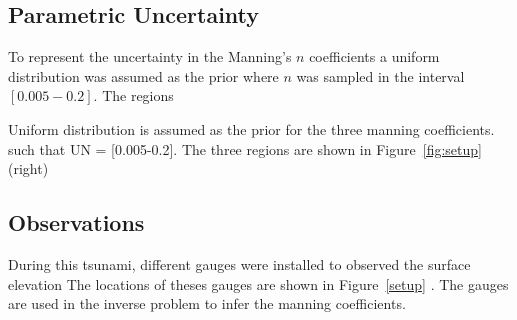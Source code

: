 \subsection{Parametric Uncertainty}
To represent the uncertainty in the Manning's $n$ coefficients a uniform distribution was assumed as the prior where $n$ was sampled in the interval $[0.005-0.2]$.  The regions

Uniform distribution is assumed as the prior for the three manning coefficients.
such that UN = [0.005-0.2]. The three regions are shown in Figure~\ref{fig:setup}(right)

\subsection{Observations}
During this tsunami, different gauges were installed to observed the surface elevation
The locations of theses gauges are shown in Figure~\ref{setup} .
The gauges are used in the inverse problem to infer the manning coefficients.
